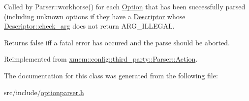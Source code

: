 Called by Parser\-::workhorse() for each \hyperlink{classxmem_1_1config_1_1third__party_1_1_option}{Option} that has been successfully parsed (including unknown options if they have a \hyperlink{structxmem_1_1config_1_1third__party_1_1_descriptor}{Descriptor} whose \hyperlink{structxmem_1_1config_1_1third__party_1_1_descriptor_a65b39f8d61de820bb5001d590e7dea5d}{Descriptor\-::check\-\_\-arg} does not return A\-R\-G\-\_\-\-I\-L\-L\-E\-G\-A\-L. 

Returns {\ttfamily false} iff a fatal error has occured and the parse should be aborted. 

Reimplemented from \hyperlink{structxmem_1_1config_1_1third__party_1_1_parser_1_1_action_aeffc43365955b3dc5f54552093518aa5}{xmem\-::config\-::third\-\_\-party\-::\-Parser\-::\-Action}.



The documentation for this class was generated from the following file\-:\begin{DoxyCompactItemize}
\item 
src/include/\hyperlink{optionparser_8h}{optionparser.\-h}\end{DoxyCompactItemize}
